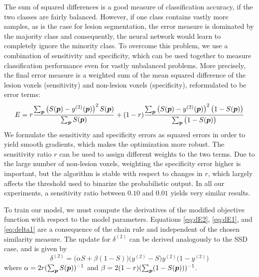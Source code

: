 The sum of squared differences is a good measure of classification accuracy, if
the two classes are fairly balanced. However, if one class contains vastly more
samples, as is the case for lesion segmentation, the error measure is dominated
by the majority class and consequently, the neural network would learn to
completely ignore the minority class. To overcome this problem, we use a
combination of sensitivity and specificity, which can be used together to
measure classification performance even for vastly unbalanced problems. More
precisely, the final error measure is a weighted sum of the mean squared
difference of the lesion voxels (sensitivity) and non-lesion voxels
(specificity), reformulated to be error terms:
\begin{equation} 
E = r\frac{\textstyle\sum_{\vect{p}} \left(S(\vect{p}) -
y^{(2)}(\vect{p})\right)^2 S(\vect{p})}{\textstyle\sum_{\vect{p}} S(\vect{p})}
  +
(1-r)\frac{\textstyle\sum_{\vect{p}} \left(S(\vect{p}) -
y^{(2)}(\vect{p})\right)^2 \big(1 - S(\vect{p})\big)}{%
\textstyle\sum_{\vect{p}}\big(1 - S(\vect{p})\big)}
\end{equation}
We formulate the sensitivity and
specificity errors as squared errors in order to yield smooth gradients, which
makes the optimization more robust. The sensitivity ratio $r$ can be used to
assign different weights to the two terms. Due to the large number of non-lesion
voxels, weighting the specificity error higher is important, but the algorithm
is stable with respect to changes in $r$, which largely affects the threshold
used to binarize the probabilistic output. In all our experiments, a sensitivity
ratio between $0.10$ and $0.01$ yields very similar results.

To train our model, we must compute the derivatives of the modified
objective function with respect to the model parameters. Equations \eqref{eq:dE2},
\eqref{eq:dE1}, and \eqref{eq:delta1} are a consequence of the chain rule
and independent of the chosen similarity measure.
%
The update for $\delta^{(2)}$ can be derived analogously to the SSD case,
and is given by
\begin{equation} 
\delta^{(2)} = \big(\alpha S + \beta (1 - S)\big)\big(y^{(2)} - S\big) y^{(2)}
\big(1 - y^{(2)}\big)
\end{equation}
where $\alpha = 2r (\sum_{\vect{p}}S(\vect{p}))^{-1}$ and $\beta = 2(1 -
r)(\sum_{\vect{p}}(1 - S(\vect{p})))^{-1}$.

